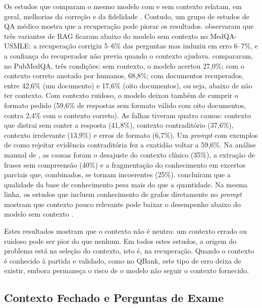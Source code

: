 Os estudos que comparam o mesmo modelo com e sem contexto relatam, em geral, melhorias da correção e da fidelidade \parencite{raputri2025retrieval,nurfadhilah2025retrieval,azam2024cancerbot}. Contudo, um grupo de estudos de \gls{QA} médico mostra que a recuperação pode piorar os resultados. \textcite{xie2026when} observaram que três variantes de \gls{RAG} ficaram abaixo do modelo sem contexto no MedQA-USMLE: a recuperação corrigiu 5--6\% das perguntas mas induziu em erro 6--7\%, e a confiança do recuperador não previa quando o contexto ajudava. \textcite{rahat2026noise} compararam, no PubMedQA, três condições: sem contexto, o modelo acertou 27,0\%; com o contexto correto anotado por humanos, 68,8\%; com documentos recuperados, entre 42,6\% (um documento) e 17,6\% (oito documentos), ou seja, abaixo de não ter contexto. Com contexto ruidoso, o modelo deixou também de cumprir o formato pedido (59,6\% de respostas sem formato válido com oito documentos, contra 2,4\% com o contexto correto). As falhas tiveram quatro causas: contexto que distrai sem conter a resposta (41,8\%), contexto contraditório (37,6\%), contexto irrelevante (13,9\%) e erros de formato (6,7\%). Um \emph{prompt} com exemplos de como rejeitar evidência contraditória fez a exatidão voltar a 59,6\%. Na análise manual de \textcite{xie2026when}, as causas foram o desajuste do contexto clínico (35\%), a extração de frases sem compreensão (40\%) e a fragmentação do conhecimento em excertos parciais que, combinados, se tornam incoerentes (25\%). \textcite{liu2026quality} concluíram que a qualidade da base de conhecimento pesa mais do que a quantidade. Na mesma linha, os estudos que incluem conhecimento de grafos diretamente no \emph{prompt} mostram que contexto pouco relevante pode baixar o desempenho abaixo do modelo sem contexto \parencite{ghanbari2025evaluating,ghanbari2025quantifying}.

Estes resultados mostram que o contexto não é neutro: um contexto errado ou ruidoso pode ser pior do que nenhum. Em todos estes estudos, a origem do problema está na seleção do contexto, isto é, na recuperação. Quando o contexto é conhecido à partida e validado, como no QBank, este tipo de erro deixa de existir, embora permaneça o risco de o modelo não seguir o contexto fornecido.

\subsection{Contexto Fechado e Perguntas de Exame}
\label{sec:chap2_closed}

